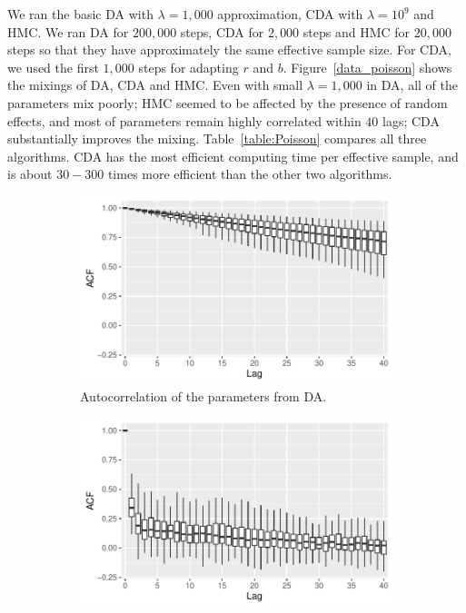 \documentclass[10pt]{article}
\begin{document}
We ran the basic DA with $\lambda=1,000$ approximation, CDA with $\lambda=10^9$ and HMC. We ran DA for $200,000$ steps, CDA for $2,000$ steps and HMC for $20,000$ steps so that they have approximately the same effective sample size. For CDA, we used the first $1,000$ steps for adapting $r$ and $b$. Figure~\ref{data_poisson} shows the mixings of DA, CDA and HMC. Even with small $\lambda = 1,000$ in DA, all of the parameters mix poorly; HMC seemed to be affected by the presence of random effects, and most of parameters remain highly correlated within $40$ lags; CDA substantially improves the mixing. Table~\ref{table:Poisson} compares all three algorithms. CDA has the most efficient computing time per effective sample, and is about $30-300$ times more efficient than the other two algorithms.


 \begin{figure}[H]
  \begin{subfigure}[b]{0.32\textwidth}
 \includegraphics[width=1\textwidth]{poisson_acf_da}
 \caption{Autocorrelation of the parameters from DA.}
 \end{subfigure}
  \hfill 
 \begin{subfigure}[b]{0.32\textwidth}
 \includegraphics[width=1\textwidth]{poisson_acf_cda}

\end{subfigure}
\end{figure}
\end{document}
